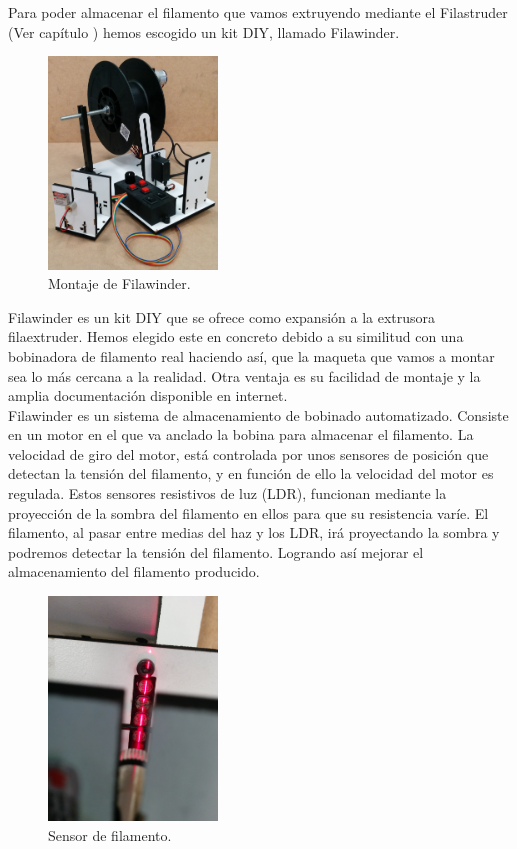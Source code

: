 Para poder almacenar el filamento que vamos extruyendo mediante el  Filastruder (Ver capítulo ) hemos escogido un kit DIY, llamado Filawinder\cite{filawinder}. 

\begin{figure}[H]
    \centering
    \includegraphics[width=0.4\textwidth]{images/filawinder/IMG_20150313_103643.jpg}
    \caption{Montaje de Filawinder.}
    \label{fig:winder_winder}
\end{figure}

Filawinder es un kit DIY que se ofrece como expansión a la extrusora  filaextruder. Hemos elegido este en concreto debido a su similitud con una bobinadora de filamento real haciendo así, que la maqueta que vamos a montar sea lo más cercana a la realidad. Otra ventaja es su facilidad de montaje y la amplia documentación disponible en internet.\\

Filawinder es un sistema de almacenamiento de bobinado automatizado. Consiste en un motor en el que va anclado la bobina para almacenar el filamento. La velocidad de giro del motor, está controlada por unos sensores de posición que detectan la tensión del filamento, y en función de ello la velocidad del motor es regulada. Estos sensores resistivos de luz (LDR), funcionan mediante la proyección de la sombra del filamento en ellos para que su resistencia varíe. El filamento, al pasar entre medias del haz y los LDR, irá proyectando la sombra y podremos detectar la tensión del filamento. Logrando así mejorar el almacenamiento del filamento producido.

\begin{figure}[H]
    \centering
    \includegraphics[width=0.4\textwidth]{images/filawinder/Sensor-filamento.jpg}
    \caption{Sensor de filamento.}
    \label{fig:winder_sensor}
\end{figure}


